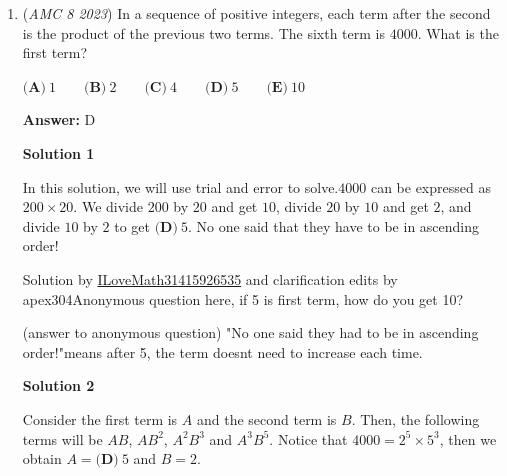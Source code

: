 \begin{enumerate}
 Hence the answer $\boxed{\textbf{(C)}\ 2}$




\textbf{Solution 6, short, quick and easy}

We know that the groups will have to be $\frac{1+2+3+4+5+6+7+8+9}{3} = 15$. For each of the greatest $3$ numbers ($7$, $8$, $9$) there are $2$ possible ways to get a total of $15$ for each group.

 


 Example ($9$): $15$ = $9$ + $5$ + $1$, or $9$ + $4$ + $2$. This will be same for $7$ and $8$.

 


 Therefore, there are $2$ ways this can be done, or $\boxed{\textbf{(C)}\ 2}$.

 Please like and subscribe

 


 


	\item (\textit{AMC 8 2023}) In a sequence of positive integers, each term after the second is the product of the previous two terms. The sixth term is $4000$. What is the first term?


 $\textbf{(A)}\ 1 \qquad \textbf{(B)}\ 2 \qquad \textbf{(C)}\ 4 \qquad \textbf{(D)}\ 5 \qquad \textbf{(E)}\ 10$

 \textbf{Answer: }D



\textbf{Solution 1}

In this solution, we will use trial and error to solve.$4000$ can be expressed as $200 \times 20$. We divide $200$ by $20$ and get $10$, divide $20$ by $10$ and get $2$, and divide $10$ by $2$ to get $\boxed{\textbf{(D)}\ 5}$. No one said that they have to be in ascending order!

 Solution by \href{https://artofproblemsolving.com/wiki/index.php?title=User:ILoveMath31415926535}{ILoveMath31415926535} and clarification edits by apex304Anonymous question here, if 5 is first term, how do you get 10?

 
(answer to anonymous question) "No one said they had to be in ascending order!"means after 5, the term doesnt need to increase each time.

 



\textbf{Solution 2}

Consider the first term is $A$ and the second term is $B$. Then, the following terms will be $AB$, $AB^2$, $A^2B^3$ and $A^3B^5$. Notice that $4000=2^5\times 5^3$, then we obtain $A=\boxed{\textbf{(D)}\ 5}$ and $B=2$. 


\end{enumerate}
